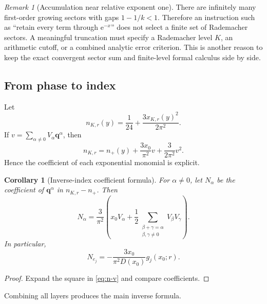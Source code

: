 \documentclass[11pt,a4paper]{article}
\numberwithin{equation}{section}
\newtheorem{corollary}[theorem]{Corollary}
\theoremstyle{remark}
\newtheorem{remark}[theorem]{Remark}
\newcommand{\e}{\mathrm e}
\begin{document}
\begin{remark}[Accumulation near relative exponent one]
There are infinitely many first-order growing sectors with gaps $1-1/k<1$.  Therefore an instruction such as ``retain every term through $\e^{-x}$'' does not select a finite set of Rademacher sectors.  A meaningful truncation must specify a Rademacher level $K$, an arithmetic cutoff, or a combined analytic error criterion.  This is another reason to keep the exact convergent sector sum and finite-level formal calculus side by side.
\end{remark}

\subsection{From phase to index}

Let
\begin{equation}\label{eq:nKr}
 n_{K,r}(y)=\frac1{24}+\frac{3x_{K,r}(y)^2}{2\pi^2}.
\end{equation}
If $v=\sum_{\alpha\ne0}V_\alpha\bm q^\alpha$, then
\begin{equation}\label{eq:n-v}
 n_{K,r}=n_+(y)+\frac{3x_0}{\pi^2}v+\frac{3}{2\pi^2}v^2.
\end{equation}
Hence the coefficient of each exponential monomial is explicit.

\begin{corollary}[Inverse-index coefficient formula]\label{cor:index-coeff}
For $\alpha\ne0$, let $N_\alpha$ be the coefficient of $\bm q^\alpha$ in $n_{K,r}-n_+$.  Then
\begin{equation}\label{eq:Nalpha}
 \boxed{
 N_\alpha=\frac3{\pi^2}
 \left(
 x_0V_\alpha+\frac12
 \sum_{\substack{\beta+\gamma=\alpha\\\beta,\gamma\ne0}}
 V_\beta V_\gamma
 \right).}
\end{equation}
In particular,
\begin{equation}\label{eq:N-first}
 N_{e_j}=-\frac{3x_0}{\pi^2D(x_0)}g_j(x_0;r).
\end{equation}
\end{corollary}

\begin{proof}
Expand the square in \cref{eq:n-v} and compare coefficients.
\end{proof}

Combining all layers produces the main inverse formula.
\end{document}
